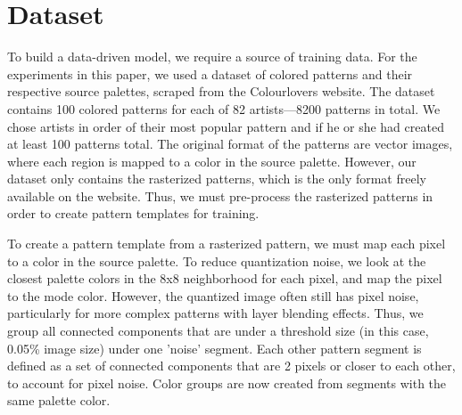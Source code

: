 \section{Dataset}
\label{sec:dataset}

To build a data-driven model, we require a source of training data. For the experiments in this paper, we used a dataset of colored patterns and their respective source palettes, scraped from the Colourlovers website. The dataset contains 100 colored patterns for each of 82 artists---8200 patterns in total. We chose artists in order of their most popular pattern and if he or she had created at least 100 patterns total. The original format of the patterns are vector images, where each region is mapped to a color in the source palette. However, our dataset only contains the rasterized patterns, which is the only format freely available on the website. Thus, we must pre-process the rasterized patterns in order to create pattern templates for training.

To create a pattern template from a rasterized pattern, we must map each pixel to a color in the source palette. To reduce quantization noise, we look at the closest palette colors in the 8x8 neighborhood for each pixel, and map the pixel to the mode color. However, the quantized image often still has pixel noise, particularly for more complex patterns with layer blending effects. Thus, we group all connected components that are under a threshold size (in this case, 0.05\% image size) under one 'noise' segment. Each other pattern segment is defined as a set of connected components that are 2 pixels or closer to each other, to account for pixel noise. Color groups are now created from segments with the same palette color.


